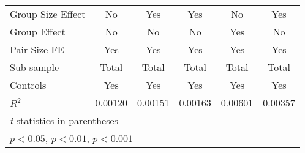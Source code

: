{\begin{tabular}{l*{5}{c}}
Group Size Effect&       No         &      Yes         &      Yes         &       No         &      Yes         \\
Group Effect    &       No         &       No         &       No         &      Yes         &       No         \\
Pair Size FE    &      Yes         &      Yes         &      Yes         &      Yes         &      Yes         \\
Sub-sample      &    Total         &    Total         &    Total         &    Total         &    Total         \\
Controls        &      Yes         &      Yes         &      Yes         &      Yes         &      Yes         \\
$ R^2 $         &  0.00120         &  0.00151         &  0.00163         &  0.00601         &  0.00357         \\
\hline\hline
\multicolumn{6}{l}{\footnotesize \textit{t} statistics in parentheses}\\
\multicolumn{6}{l}{\footnotesize \sym{*} \(p<0.05\), \sym{**} \(p<0.01\), \sym{***} \(p<0.001\)}\\
\end{tabular}
}
